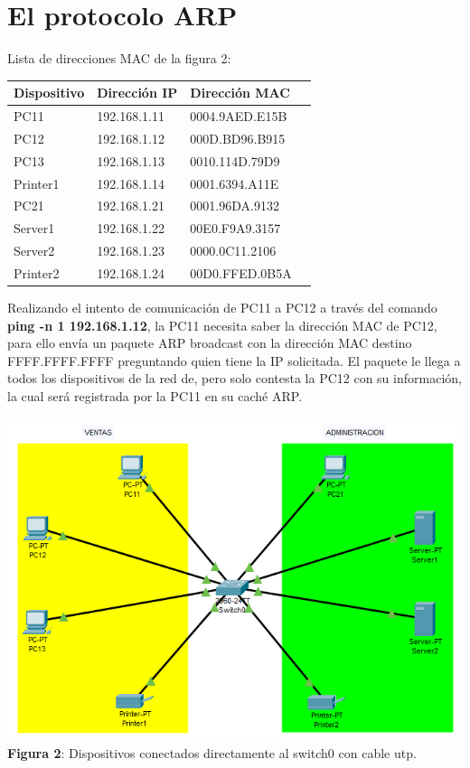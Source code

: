 \documentclass{article}
\begin{document}
    \section{El protocolo ARP}
    Lista de direcciones MAC de la figura 2:
    \begin{center}
        \begin{tabular}{| p{3cm} | p{4.1cm} | p{4.1cm} | p{4.1cm} |}
            \hline
            {\bfseries Dispositivo} & {\bfseries Dirección IP} & {\bfseries Dirección MAC} \\\hline
            PC11 & 192.168.1.11 & 0004.9AED.E15B \\\hline
            PC12 & 192.168.1.12 & 000D.BD96.B915 \\\hline
            PC13 & 192.168.1.13 & 0010.114D.79D9 \\\hline
            Printer1 & 192.168.1.14 & 0001.6394.A11E \\\hline
            PC21 & 192.168.1.21 & 0001.96DA.9132 \\\hline
            Server1 & 192.168.1.22 & 00E0.F9A9.3157 \\\hline
            Server2 & 192.168.1.23 & 0000.0C11.2106 \\\hline
            Printer2 & 192.168.1.24 & 00D0.FFED.0B5A \\\hline
        \end{tabular}
    \end{center} 
    
    Realizando el intento de comunicación de PC11 a PC12 a través del comando {\bfseries ping -n 1 192.168.1.12}, la PC11 necesita saber la dirección MAC de PC12, para ello envía un paquete ARP broadcast con la dirección MAC destino FFFF.FFFF.FFFF preguntando quien tiene la IP solicitada. El paquete le llega a todos los dispositivos de la red de, pero solo contesta la PC12 con su información, la cual será registrada por la PC11 en su caché ARP.

    \begin{center}
        \includegraphics[width=0.85\linewidth]{img_03} 
        \linebreak
        \small {\bfseries Figura 2}: Dispositivos conectados directamente al switch0 con cable utp.
    \end{center}
\end{document}

